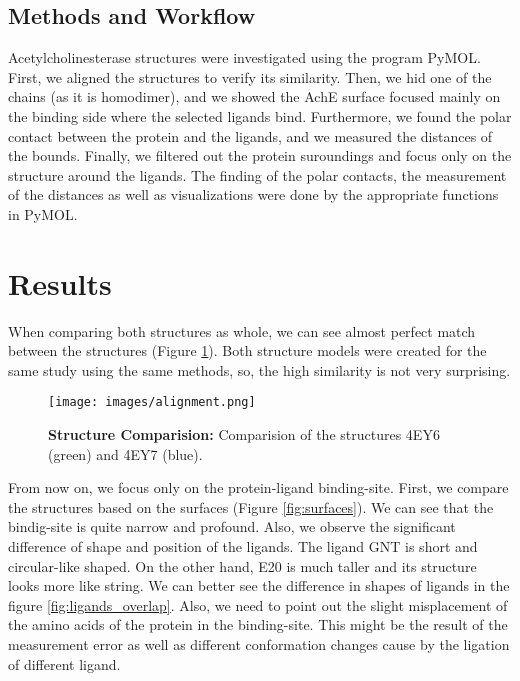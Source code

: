 \documentclass[10pt,a4paper,twocolumn]{article}
\begin{document}
\subsection*{Methods and Workflow}
Acetylcholinesterase structures were investigated using the program PyMOL. First, 
we aligned the structures to verify its similarity. Then, we hid one of the 
chains (as it is homodimer), and we showed the AchE 
surface focused mainly on the binding side where the selected
ligands bind. Furthermore, we found the polar contact between the protein and 
the ligands, and we measured the distances of the bounds. 
Finally, we filtered out the protein suroundings and focus only on the 
structure around the ligands. The finding of the polar contacts, the
measurement of the distances as well as visualizations were done 
by the appropriate functions in PyMOL.



\section*{Results}

When comparing both structures as whole, we can see almost perfect 
match between the structures (Figure \ref{fig:alignment}). Both 
structure models were created for the same study using the same 
methods, so, the high similarity is not very surprising.


\begin{figure}[tb]
    \centering
    \texttt{[image: images/alignment.png]}
    \caption{\textbf{Structure Comparision:} 
    Comparision of the structures 4EY6 (green) and 4EY7 (blue).}
    \label{fig:alignment}
  \end{figure} 
  

From now on, we focus only on the protein-ligand binding-site. 
First, we compare the structures based on the surfaces 
(Figure \ref{fig:surfaces}). We can see that the bindig-site 
is quite narrow and profound. Also, we observe the significant 
difference of shape and position of the ligands. The ligand GNT is 
short and circular-like shaped. On the other hand, E20 is much 
taller and its structure looks more like string. We can better see
the difference in shapes of ligands in the figure 
\ref{fig:ligands_overlap}. Also, we need to point out the slight 
misplacement of the amino acids of the protein in the binding-site.
This might be the result of the measurement error as well as different
conformation changes cause by the ligation of different ligand.
\end{document}
